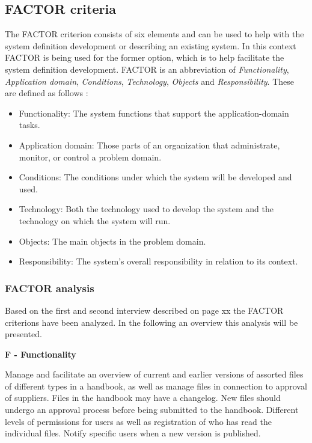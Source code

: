 \subsection{FACTOR criteria} \label{sec:factorcriteria}
The FACTOR criterion consists of six elements and can be used to help with the system definition development or describing an existing system.
In this context FACTOR is being used for the former option, which is to help facilitate the system definition development.
FACTOR is an abbreviation of \textit{Functionality}, \textit{Application domain}, \textit{Conditions}, \textit{Technology}, \textit{Objects} and \textit{Responsibility}.
These are defined as follows \citep[p.~40]{Rod-Aalborg}:
\begin{itemize}
	\item
		Functionality:
		The system functions that support the application-domain tasks.
	\item
		Application domain:
		Those parts of an organization that administrate, monitor, or control a problem domain.
	\item
		Conditions:
		The conditions under which the system will be developed and used.
	\item
		Technology:
		Both the technology used to develop the system and the technology on which the system will run.
	\item
		Objects:
		The main objects in the problem domain.
	\item
		Responsibility:
		The system’s overall responsibility in relation to its context.
\end{itemize}

\subsubsection{FACTOR analysis}
Based on the first and second interview described on {\color{red}page xx} the FACTOR criterions have been analyzed.
In the following an overview this analysis will be presented.

\textbf{F - Functionality}

Manage and facilitate an overview of current and earlier versions of assorted files of different types in a handbook, as well as manage files in connection to approval of suppliers.
Files in the handbook may have a changelog.
New files should undergo an approval process before being submitted to the handbook.
Different levels of permissions for users as well as registration of who has read the individual files.
Notify specific users when a new version is published.

